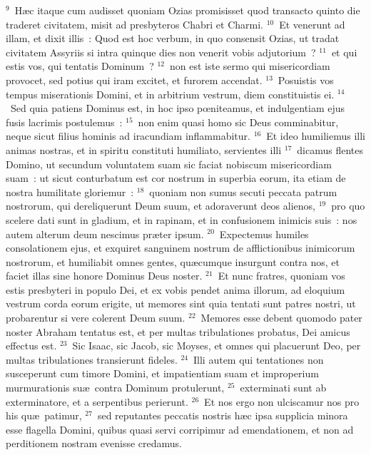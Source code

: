 ${}^{9}$~H\ae c itaque cum audisset quoniam Ozias promisisset quod transacto quinto die traderet civitatem, misit ad presbyteros Chabri et Charmi.
${}^{10}$~Et venerunt ad illam, et dixit illis~: Quod est hoc verbum, in quo consensit Ozias, ut tradat civitatem Assyriis si intra quinque dies non venerit vobis adjutorium~?
${}^{11}$~et qui estis vos, qui tentatis Dominum~?
${}^{12}$~non est iste sermo qui misericordiam provocet, sed potius qui iram excitet, et furorem accendat.
${}^{13}$~Posuistis vos tempus miserationis Domini, et in arbitrium vestrum, diem constituistis ei.
${}^{14}$~Sed quia patiens Dominus est, in hoc ipso pœniteamus, et indulgentiam ejus fusis lacrimis postulemus~:
${}^{15}$~non enim quasi homo sic Deus comminabitur, neque sicut filius hominis ad iracundiam inflammabitur.
${}^{16}$~Et ideo humiliemus illi animas nostras, et in spiritu constituti humiliato, servientes illi
${}^{17}$~dicamus flentes Domino, ut secundum voluntatem suam sic faciat nobiscum misericordiam suam~: ut sicut conturbatum est cor nostrum in superbia eorum, ita etiam de nostra humilitate gloriemur~:
${}^{18}$~quoniam non sumus secuti peccata patrum nostrorum, qui dereliquerunt Deum suum, et adoraverunt deos alienos,
${}^{19}$~pro quo scelere dati sunt in gladium, et in rapinam, et in confusionem inimicis suis~: nos autem alterum deum nescimus pr\ae ter ipsum.
${}^{20}$~Expectemus humiles consolationem ejus, et exquiret sanguinem nostrum de afflictionibus inimicorum nostrorum, et humiliabit omnes gentes, qu\ae cumque insurgunt contra nos, et faciet illas sine honore Dominus Deus noster.
${}^{21}$~Et nunc fratres, quoniam vos estis presbyteri in populo Dei, et ex vobis pendet anima illorum, ad eloquium vestrum corda eorum erigite, ut memores sint quia tentati sunt patres nostri, ut probarentur si vere colerent Deum suum.
${}^{22}$~Memores esse debent quomodo pater noster Abraham tentatus est, et per multas tribulationes probatus, Dei amicus effectus est.
${}^{23}$~Sic Isaac, sic Jacob, sic Moyses, et omnes qui placuerunt Deo, per multas tribulationes transierunt fideles.
${}^{24}$~Illi autem qui tentationes non susceperunt cum timore Domini, et impatientiam suam et improperium murmurationis su\ae\ contra Dominum protulerunt,
${}^{25}$~exterminati sunt ab exterminatore, et a serpentibus perierunt.
${}^{26}$~Et nos ergo non ulciscamur nos pro his qu\ae\ patimur,
${}^{27}$~sed reputantes peccatis nostris h\ae c ipsa supplicia minora esse flagella Domini, quibus quasi servi corripimur ad emendationem, et non ad perditionem nostram evenisse credamus.


